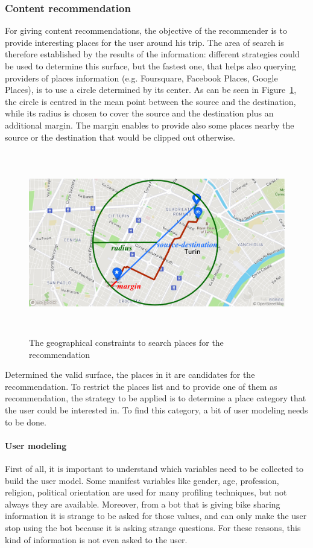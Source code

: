 \subsubsection{Content recommendation}
\label{approachRec}

For giving content recommendations, the objective of the recommender is to provide interesting places for the user around his trip. The area of search is therefore established by the results of the information: different strategies could be used to determine this surface, but the fastest one, that helps also querying providers of places information (e.g. Foursquare, Facebook Places, Google Places), is to use a circle determined by its center. As can be seen in Figure~\ref{fig:placesSearch}, the circle is centred in the mean point between the source and the destination, while its radius is chosen to cover the source and the destination plus an additional margin. The margin enables to provide also some places nearby the source or the destination that would be clipped out otherwise.

\begin{figure}[!htb]
    \centering
    \includegraphics[max width=0.9\linewidth,max height=8cm,keepaspectratio]{figures/placesSearch}
    \caption{The geographical constraints to search places for the recommendation}\label{fig:placesSearch}
\end{figure}

Determined the valid surface, the places in it are candidates for the recommendation. To restrict the places list and to provide one of them as recommendation, the strategy to be applied is to determine a place category that the user could be interested in. To find this category, a bit of user modeling needs to be done.

\paragraph{User modeling}
First of all, it is important to understand which variables need to be collected to build the user model. Some manifest variables like gender, age, profession, religion, political orientation are used for many profiling techniques, but not always they are available. Moreover, from a bot that is giving bike sharing information it is strange to be asked for those values, and can only make the user stop using the bot because it is asking strange questions. For these reasons, this kind of information is not even asked to the user.

